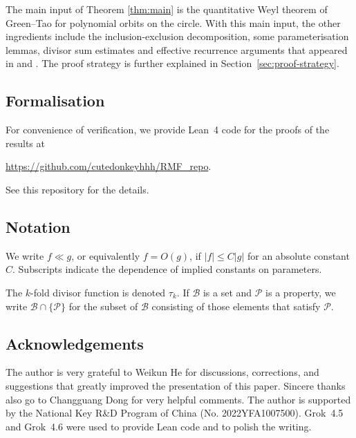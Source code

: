 The main input of Theorem \ref{thm:main} is the quantitative Weyl theorem of Green--Tao \cite{BT} for polynomial orbits on the circle.
With this main input, the other ingredients
include the inclusion-exclusion decomposition, some parameterisation lemmas, divisor sum estimates and effective recurrence arguments that appeared
in \cite{BT} and \cite[\S3]{GTmob}.
The proof strategy is further explained in Section~\ref{sec:proof-strategy}.

\subsection{Formalisation}
\label{sec:formalisation}
For convenience of verification, we provide Lean~4 code for the proofs
of the results at
\begin{center}
\url{https://github.com/cutedonkeyhhh/RMF_repo}.
\end{center}
See this repository for the details.


\subsection{Notation}
\label{sec:notation}

We write $f\ll g$, or equivalently $f=O(g)$, if $|f|\leq C|g|$ for an absolute constant $C$.
Subscripts indicate the dependence of implied constants on parameters.

The $k$-fold divisor function is denoted $\tau_k$.
If $\mathcal{B}$ is a set and $\mathcal{P}$ is a property, we write $\mathcal{B}\cap\{\mathcal{P}\}$ for the subset of $\mathcal{B}$ consisting of those elements that satisfy $\mathcal{P}$.

\subsection*{Acknowledgements}

The author is very grateful to  Weikun He for discussions, corrections, and suggestions that greatly improved the presentation of this paper. Sincere thanks also go to  Changguang Dong for very helpful comments. 
The author is supported by the National Key R\&D Program of China (No. 2022YFA1007500).
Grok~4.5 and Grok~4.6 were used to provide Lean code and to polish the writing.
